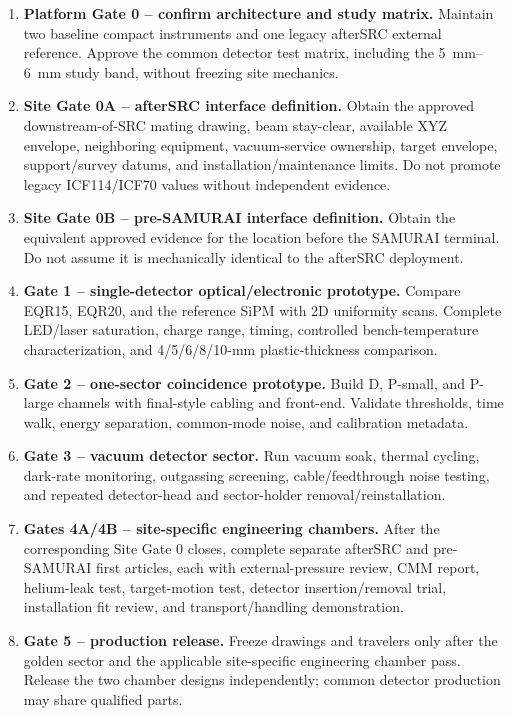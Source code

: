 \documentclass[10pt,letterpaper]{article}
\begin{document}
\begin{enumerate}
  \item \textbf{Platform Gate 0 -- confirm architecture and study matrix.} Maintain two
    baseline compact instruments and one legacy afterSRC external reference. Approve the
    common detector test matrix, including the \SIrange{5}{6}{\milli\meter} study band,
    without freezing site mechanics.
  \item \textbf{Site Gate 0A -- afterSRC interface definition.} Obtain the approved
    downstream-of-SRC mating drawing, beam stay-clear, available XYZ envelope, neighboring
    equipment, vacuum-service ownership, target envelope, support/survey datums, and
    installation/maintenance limits. Do not promote legacy ICF114/ICF70 values without
    independent evidence.
  \item \textbf{Site Gate 0B -- pre-SAMURAI interface definition.} Obtain the equivalent
    approved evidence for the location before the SAMURAI terminal. Do not assume it is
    mechanically identical to the afterSRC deployment.
  \item \textbf{Gate 1 -- single-detector optical/electronic prototype.} Compare EQR15,
    EQR20, and the reference SiPM with 2D uniformity scans. Complete LED/laser saturation,
    charge range, timing, controlled bench-temperature characterization, and
    4/5/6/8/10-mm plastic-thickness comparison.
  \item \textbf{Gate 2 -- one-sector coincidence prototype.} Build D, P-small, and P-large
    channels with final-style cabling and front-end. Validate thresholds, time walk, energy
    separation, common-mode noise, and calibration metadata.
  \item \textbf{Gate 3 -- vacuum detector sector.} Run vacuum soak, thermal cycling,
    dark-rate monitoring, outgassing screening, cable/feedthrough noise testing, and repeated
    detector-head and sector-holder removal/reinstallation.
  \item \textbf{Gates 4A/4B -- site-specific engineering chambers.} After the corresponding
    Site Gate 0 closes, complete separate afterSRC and pre-SAMURAI first articles, each with
    external-pressure review, CMM report, helium-leak test, target-motion test, detector
    insertion/removal trial, installation fit review, and transport/handling demonstration.
  \item \textbf{Gate 5 -- production release.} Freeze drawings and travelers only after
    the golden sector and the applicable site-specific engineering chamber pass. Release the
    two chamber designs independently; common detector production may share qualified parts.
\end{enumerate}
\end{document}
